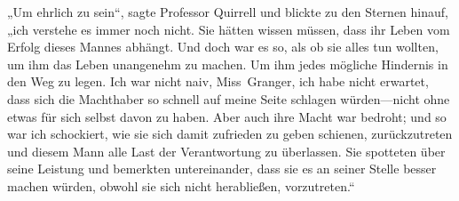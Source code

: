 „Um ehrlich zu sein“, sagte Professor Quirrell und blickte zu den Sternen hinauf, „ich verstehe es immer noch nicht. Sie hätten wissen müssen, dass ihr Leben vom Erfolg dieses Mannes abhängt. Und doch war es so, als ob sie alles tun wollten, um ihm das Leben unangenehm zu machen. Um ihm jedes mögliche Hindernis in den Weg zu legen. Ich war nicht naiv, Miss~Granger, ich habe nicht erwartet, dass sich die Machthaber so schnell auf meine Seite schlagen würden—nicht ohne etwas für sich selbst davon zu haben. Aber auch ihre Macht war bedroht; und so war ich schockiert, wie sie sich damit zufrieden zu geben schienen, zurückzutreten und diesem Mann alle Last der Verantwortung zu überlassen. Sie spotteten über seine Leistung und bemerkten untereinander, dass sie es an seiner Stelle besser machen würden, obwohl sie sich nicht herabließen, vorzutreten.“
